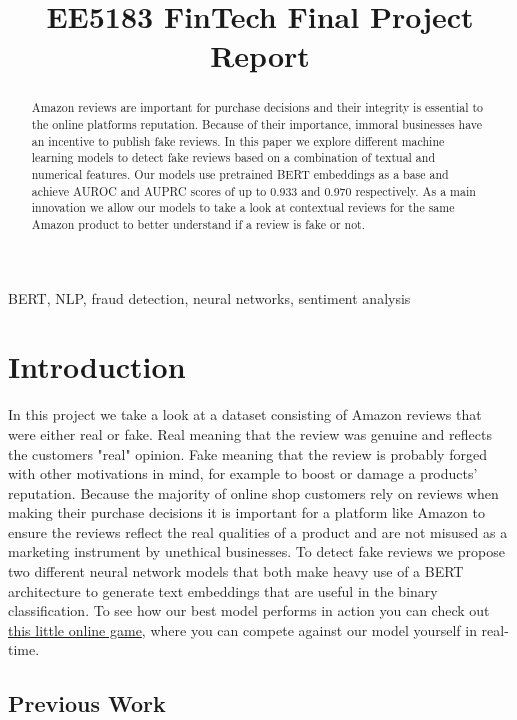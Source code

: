 \documentclass{article}
\title{EE5183 FinTech Final Project Report}
\begin{document}
%
\maketitle
%
\begin{abstract}
  Amazon reviews are important for purchase decisions and their integrity is essential to the online platforms reputation. Because of their importance, immoral businesses have an incentive to publish fake reviews. In this paper we explore different machine learning models to detect fake reviews based on a combination of textual and numerical features. Our models use pretrained BERT embeddings as a base and achieve AUROC and AUPRC scores of up to 0.933 and 0.970 respectively.
  As a main innovation we allow our models to take a look at contextual reviews for the same Amazon product to better understand if a review is fake or not.

\end{abstract}
%
\begin{keywords}
  BERT, NLP, fraud detection, neural networks, sentiment analysis
\end{keywords}
%
\section{Introduction}
\label{sec:intro}

In this project we take a look at a dataset consisting of Amazon reviews that were either real or fake. Real meaning that the review was genuine and reflects the customers "real" opinion. Fake meaning that the review is probably forged with other motivations in mind, for example to boost or damage a products' reputation.
Because the majority of online shop customers rely on reviews when making their purchase decisions it is important for a platform like Amazon to ensure the reviews reflect the real qualities of a product and are not misused as a marketing instrument by unethical businesses.
To detect fake reviews we propose two different neural network models that both make heavy use of a BERT architecture to generate text embeddings that are useful in the binary classification. To see how our best model performs in action you can check out \href{https://tadeohepperle.com/amazon-fake-reviews/}{this little online game}, where you can compete against our model yourself in real-time.

\subsection{Previous Work}
\end{document}

